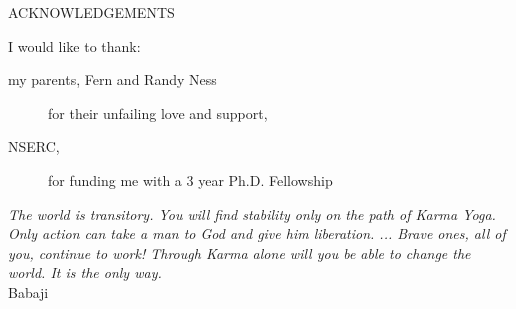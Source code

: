 \newpage
{}

\begin{center}
ACKNOWLEDGEMENTS
\end{center}

\noindent I would like to thank:
\begin{description}
\item[my parents, Fern and Randy Ness]
	for their unfailing love and support,
\item[NSERC,]
	for funding me with a 3 year Ph.D. Fellowship
\end{description}

\begin{flushright}
\textit{The world is transitory. You will find stability only on the path of
Karma Yoga. Only action can take a man to God and give him
liberation. ...  Brave ones, all of you, continue to work!  Through
Karma alone will you be able to change the world. It is the only
way.}
\\
Babaji \\
\end{flushright}

